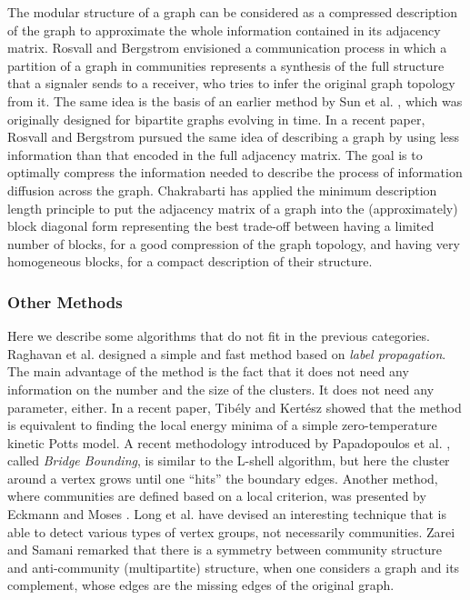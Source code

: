 The modular structure of a graph can be considered as a compressed description of the graph to approximate the whole information contained
in its adjacency matrix. Rosvall and Bergstrom \cite{Rosvall01052007} envisioned a communication process in which a partition of a graph in
communities represents a synthesis of the full structure that a signaler sends to a receiver, who tries to infer the original graph topology
from it. The same idea is the basis of an earlier method by Sun et al. \cite{Sun:2007}, which was originally designed for bipartite
graphs evolving in time. In a recent paper, Rosvall and Bergstrom \cite{Rosvall290} pursued the same idea of describing a graph by using
less information than that encoded in the full adjacency matrix. The goal is to optimally compress the information needed to describe the
process of information diffusion across the graph. Chakrabarti \cite{Chakrabarti04a} has applied
the minimum description length principle to put the adjacency matrix of a graph into the (approximately) block diagonal form representing
the best trade-off between having a limited number of blocks, for a good compression of the graph topology, and having very homogeneous
blocks, for a compact description of their structure.

\subsubsection*{Other Methods}
Here we describe some algorithms that do not fit in the previous categories. Raghavan et al. \cite{Raghavan} designed a simple and fast
method based on {\em label propagation}. The main advantage of the method is the fact that it does not need any
information on the number and the size of the clusters. It does not need any parameter, either. In a recent paper, Tib{\'e}ly and
Kert{\'e}sz \cite{Tiby20084982} showed that the method is equivalent to finding the local energy minima of a simple zero-temperature kinetic
Potts model.  A recent methodology introduced by Papadopoulos et al. \cite{Skusa}, called {\em
Bridge Bounding}, is similar to the L-shell algorithm, but here the cluster around a vertex grows until one ``hits'' the boundary edges.
Another method, where communities are defined based on a local criterion, was presented by Eckmann and Moses
\cite{Eckmann300}. Long et al. \cite{Long:2007} have devised an interesting technique that is able to detect various types of vertex groups,
not necessarily communities. Zarei and Samani \cite{Zarei200} remarked that there is a symmetry between community structure and
anti-community (multipartite) structure, when one considers a graph and its complement, whose edges are the missing edges of the original
graph. 

